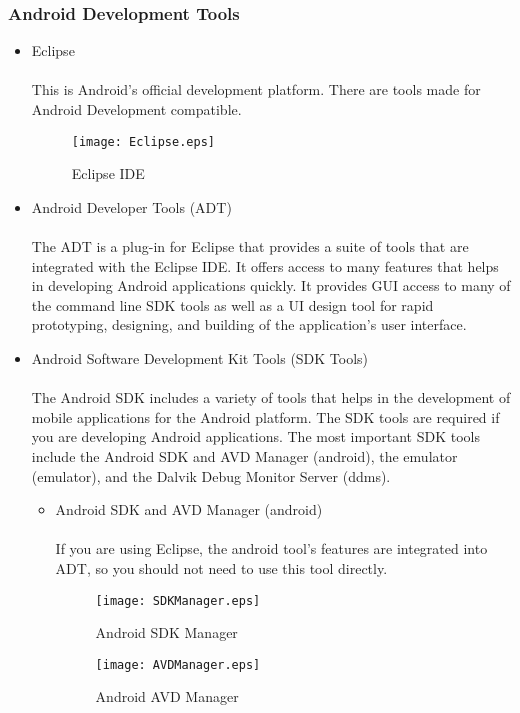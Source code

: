 \subsubsection{Android Development Tools}
\begin{itemize}
\item Eclipse
\\\\This is Android's official development platform. There are tools made for Android Development compatible.
\begin{figure}[htbp!]   
   \centering           
   \texttt{[image: Eclipse.eps]} 
   \caption{Eclipse IDE}
   \label{fig:eclipseide}
\end{figure}
\item Android Developer Tools (ADT)
\\\\The ADT is a plug-in for Eclipse that provides a suite of tools that are integrated with the Eclipse IDE. It offers access to many features that helps in developing Android applications quickly. It provides GUI access to many of the command line SDK tools as well as a UI design tool for rapid prototyping, designing, and building of the application's user interface.
\item Android Software Development Kit Tools (SDK Tools)
\\\\The Android SDK includes a variety of tools that helps in the development of mobile applications for the Android platform. The SDK tools are required if you are developing Android applications. The most important SDK tools include the Android SDK and AVD Manager (android), the emulator (emulator), and the Dalvik Debug Monitor Server (ddms).
\begin{itemize}
\item Android SDK and AVD Manager (android)
\\\\If you are using Eclipse, the android tool’s features are integrated into ADT, so you should not need to use this tool directly.
\pagebreak
\begin{figure}[htbp!]   
   \centering           
   \texttt{[image: SDKManager.eps]} 
   \caption{Android SDK Manager}
   \label{fig:sdkmanager}
\end{figure}
\begin{figure}[htbp!]   
   \centering           
   \texttt{[image: AVDManager.eps]} 
   \caption{Android AVD Manager}

\end{figure}
\end{itemize}
\end{itemize}

